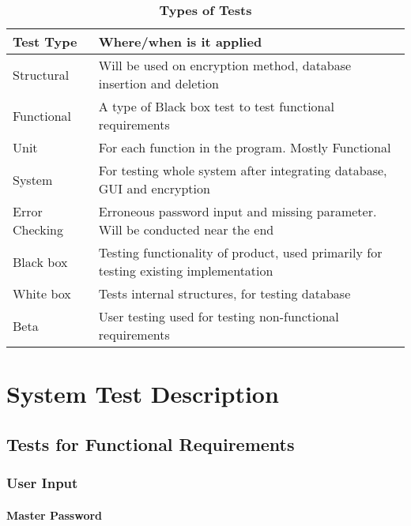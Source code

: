\documentclass[12pt, titlepage]{article}
\begin{document}
\begin{table}[!htbp]
    \caption{\textbf{Types of Tests} \label{Table}}
    \begin{tabularx}{\textwidth}{p{3cm}X}
        \toprule
        \textbf{Test Type} & \textbf{Where/when is it applied}\\
        \midrule
        Structural & Will be used on encryption method, database insertion and deletion\\\hline
        Functional & A type of Black box test to test functional requirements\\\hline 
        Unit & For each function in the program. Mostly Functional\\\hline
        System & For testing whole system after integrating database, GUI and encryption\\\hline
        Error Checking & Erroneous password input and missing parameter. Will be conducted near the end\\\hline
        Black box & Testing functionality of product, used primarily for testing existing implementation\\\hline
        White box & Tests internal structures, for testing database\\\hline
        Beta & User testing used for testing non-functional requirements\\
        \bottomrule
    \end{tabularx}
\end{table}

\section{System Test Description}
	
\subsection{Tests for Functional Requirements}

\subsubsection{User Input}
		
\paragraph{Master Password}
\end{document}
